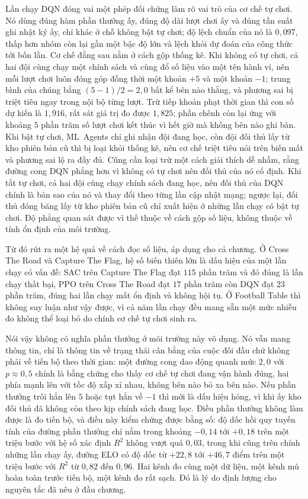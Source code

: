 \indent Lần chạy DQN đóng vai một phép đối chứng làm rõ vai trò của cơ chế tự chơi. Nó dùng
đúng hàm phần thưởng ấy, đúng độ dài lượt chơi ấy và đúng tần suất ghi nhật ký ấy, chỉ khác ở
chỗ không bật tự chơi; độ lệch chuẩn của nó là $0{,}097$, thấp hơn nhóm còn lại gần một bậc
độ lớn và lệch khỏi dự đoán của công thức tới bốn lần. Cơ chế đằng sau nằm ở cách gộp thống
kê. Khi không có tự chơi, cả hai đội cùng chạy một chính sách và cùng đổ số liệu vào một tên
hành vi, nên mỗi lượt chơi luôn đóng góp đồng thời một khoản $+5$ và một khoản $-1$; trung
bình của chúng bằng $(5-1)/2 = 2{,}0$ bất kể bên nào thắng, và phương sai bị triệt tiêu ngay
trong nội bộ từng lượt. Trừ tiếp khoản phạt thời gian thì con số dự kiến là $1{,}916$, rất
sát giá trị đo được $1{,}825$; phần chênh còn lại ứng với khoảng $5$ phần trăm số lượt chơi
kết thúc vì hết giờ mà không bên nào ghi bàn. Khi bật tự chơi, ML~Agents chỉ ghi nhận đội
đang học, còn đội đối thủ lấy từ kho phiên bản cũ thì bị loại khỏi thống kê, nên cơ chế triệt
tiêu nói trên biến mất và phương sai lộ ra đầy đủ. Cũng cần loại trừ một cách giải thích dễ
nhầm, rằng đường cong DQN phẳng hơn vì không có tự chơi nên đối thủ của nó cố định. Khi tắt
tự chơi, cả hai đội cùng chạy chính sách đang học, nên đối thủ của DQN chính là bản sao của
nó và thay đổi theo từng lần cập nhật mạng; ngược lại, đối thủ đóng băng lấy từ kho phiên bản
cũ chỉ xuất hiện ở những lần chạy có bật tự chơi. Độ phẳng quan sát được vì thế thuộc về cách
gộp số liệu, không thuộc về tính ổn định của môi trường.

\indent Từ đó rút ra một hệ quả về cách đọc số liệu, áp dụng cho cả chương. Ở Cross The Road
và Capture The Flag, hệ số biến thiên lớn là dấu hiệu của một lần chạy có vấn đề: SAC trên
Capture The Flag đạt $115$ phần trăm và đó đúng là lần chạy thất bại, PPO trên Cross The Road
đạt $17$ phần trăm còn DQN đạt $23$ phần trăm, đúng hai lần chạy mất ổn định và không hội tụ.
Ở Football Table thì không suy luận như vậy được, vì cả năm lần chạy đều mang sẵn một mức
nhiễu đo không thể loại bỏ do chính cơ chế tự chơi sinh ra.

\indent Nói vậy không có nghĩa phần thưởng ở môi trường này vô dụng. Nó vẫn mang thông tin,
chỉ là thông tin về trạng thái cân bằng của cuộc đối đầu chứ không phải về tiến bộ theo thời
gian: một đường cong dao động quanh mức $2{,}0$ với $p \approx 0{,}5$ chính là bằng chứng cho
thấy cơ chế tự chơi đang vận hành đúng, hai phía mạnh lên với tốc độ xấp xỉ nhau, không bên
nào bỏ xa bên nào. Nếu phần thưởng trôi hẳn lên $5$ hoặc tụt hẳn về $-1$ thì mới là dấu hiệu
hỏng, vì khi ấy kho đối thủ đã không còn theo kịp chính sách đang học. Điều phần thưởng không
làm được là đo tiến bộ, và điều này kiểm chứng được bằng số: độ dốc hồi quy tuyến tính của
đường phần thưởng chỉ nằm trong khoảng $-0{,}14$ tới $+0{,}18$ trên một triệu bước với hệ số
xác định $R^{2}$ không vượt quá $0{,}03$, trong khi cũng trên chính những lần chạy ấy, đường
ELO có độ dốc từ $+22{,}8$ tới $+46{,}7$ điểm trên một triệu bước với $R^{2}$ từ $0{,}82$ đến
$0{,}96$. Hai kênh đo cùng một dữ liệu, một kênh mù hoàn toàn trước tiến bộ, một kênh đo rất
sạch. Đó là lý do định lượng cho nguyên tắc đã nêu ở đầu chương.


